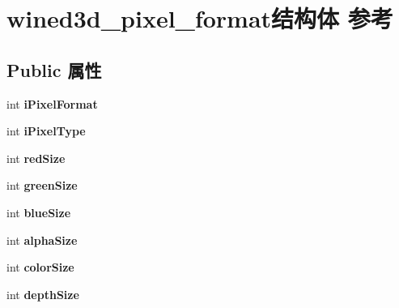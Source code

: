 \hypertarget{structwined3d__pixel__format}{}\section{wined3d\+\_\+pixel\+\_\+format结构体 参考}
\label{structwined3d__pixel__format}
\subsection*{Public 属性}
\begin{DoxyCompactItemize}
\item 
\mbox{\label{structwined3d__pixel__format_a1bb9f57050c10bfdc253ef297dc6ebe4}} 
int {\bfseries i\+Pixel\+Format}
\item 
\mbox{\label{structwined3d__pixel__format_ad977c72280847e2b157154dbf6fef1d1}} 
int {\bfseries i\+Pixel\+Type}
\item 
\mbox{\label{structwined3d__pixel__format_a03360bdacbbd8ff4bbfd6f145fc8b765}} 
int {\bfseries red\+Size}
\item 
\mbox{\label{structwined3d__pixel__format_a89479af7a678355a3c04e7ff71171ea1}} 
int {\bfseries green\+Size}
\item 
\mbox{\label{structwined3d__pixel__format_a853707af2969d1d83fd6946bb334335c}} 
int {\bfseries blue\+Size}
\item 
\mbox{\label{structwined3d__pixel__format_afc5f5b2590350f3ab3606f8298a03e5c}} 
int {\bfseries alpha\+Size}
\item 
\mbox{\label{structwined3d__pixel__format_a59cc7163ed2e867edcca439b779f514e}} 
int {\bfseries color\+Size}
\item 
\mbox{\label{structwined3d__pixel__format_a82ac1fb5b34008a8edced5edded93105}} 
int {\bfseries depth\+Size}
\item 
\mbox{\label{structwined3d__pixel__format_a489effd3f2a7f12f466a77115c5f3f4b}} 

\end{DoxyCompactItemize}
